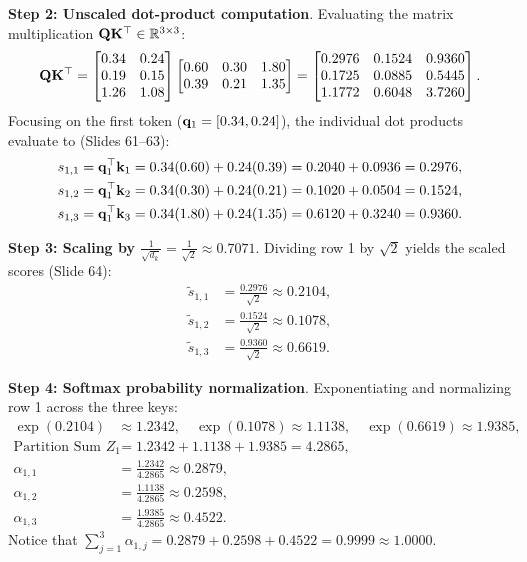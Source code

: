 \documentclass[../../../main.tex]{subfiles}
\begin{document}
\noindent\textbf{Step 2: Unscaled dot-product computation}.\newline
Evaluating the matrix multiplication $\mathbf{Q} \mathbf{K}^\top \in \mathbb{R}^{3 \times 3}$:
\begin{equation}
\mathbf{Q} \mathbf{K}^\top = \begin{bmatrix}
0.34 & 0.24 \\
0.19 & 0.15 \\
1.26 & 1.08
\end{bmatrix}
\begin{bmatrix}
0.60 & 0.30 & 1.80 \\
0.39 & 0.21 & 1.35
\end{bmatrix}
= \begin{bmatrix}
0.2976 & 0.1524 & 0.9360 \\
0.1725 & 0.0885 & 0.5445 \\
1.1772 & 0.6048 & 3.7260
\end{bmatrix}.
\end{equation}
Focusing on the first token ($\mathbf{q}_1 = [0.34, 0.24]$), the individual dot products evaluate to (Slides 61--63):
\begin{align}
s_{1,1} &= \mathbf{q}_1^\top \mathbf{k}_1 = 0.34(0.60) + 0.24(0.39) = 0.2040 + 0.0936 = 0.2976, \\
s_{1,2} &= \mathbf{q}_1^\top \mathbf{k}_2 = 0.34(0.30) + 0.24(0.21) = 0.1020 + 0.0504 = 0.1524, \\
s_{1,3} &= \mathbf{q}_1^\top \mathbf{k}_3 = 0.34(1.80) + 0.24(1.35) = 0.6120 + 0.3240 = 0.9360.
\end{align}

\noindent\textbf{Step 3: Scaling by $\frac{1}{\sqrt{d_k}} = \frac{1}{\sqrt{2}} \approx 0.7071$}.\newline
Dividing row 1 by $\sqrt{2}$ yields the scaled scores (Slide 64):
\begin{align}
\tilde{s}_{1,1} &= \frac{0.2976}{\sqrt{2}} \approx 0.2104, \\
\tilde{s}_{1,2} &= \frac{0.1524}{\sqrt{2}} \approx 0.1078, \\
\tilde{s}_{1,3} &= \frac{0.9360}{\sqrt{2}} \approx 0.6619.
\end{align}

\noindent\textbf{Step 4: Softmax probability normalization}.\newline
Exponentiating and normalizing row 1 across the three keys:
\begin{align}
\exp(0.2104) &\approx 1.2342, \quad \exp(0.1078) \approx 1.1138, \quad \exp(0.6619) \approx 1.9385, \\
\text{Partition Sum } Z_1 &= 1.2342 + 1.1138 + 1.9385 = 4.2865, \\
\alpha_{1,1} &= \frac{1.2342}{4.2865} \approx 0.2879, \\
\alpha_{1,2} &= \frac{1.1138}{4.2865} \approx 0.2598, \\
\alpha_{1,3} &= \frac{1.9385}{4.2865} \approx 0.4522.
\end{align}
Notice that $\sum_{j=1}^3 \alpha_{1,j} = 0.2879 + 0.2598 + 0.4522 = 0.9999 \approx 1.0000$.
\end{document}
